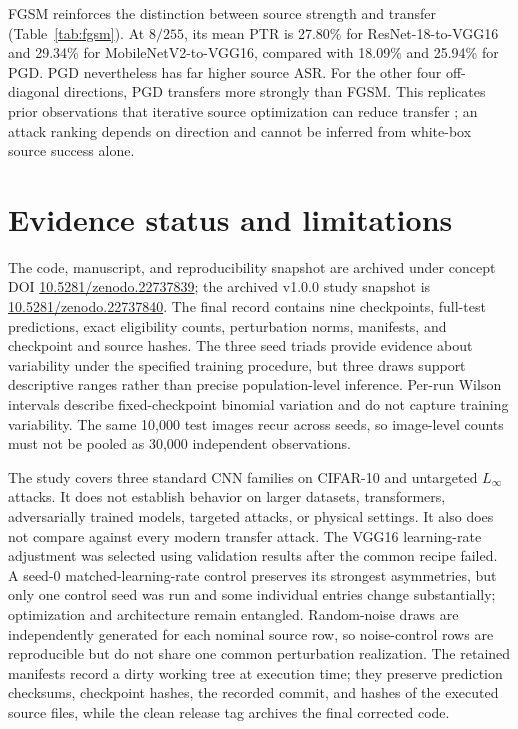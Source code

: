 \documentclass[10pt,twocolumn]{article}
\begin{document}
FGSM reinforces the distinction between source strength and transfer (Table~\ref{tab:fgsm}). At $8/255$, its mean PTR is 27.80\% for ResNet-18-to-VGG16 and 29.34\% for MobileNetV2-to-VGG16, compared with 18.09\% and 25.94\% for PGD. PGD nevertheless has far higher source ASR. For the other four off-diagonal directions, PGD transfers more strongly than FGSM. This replicates prior observations that iterative source optimization can reduce transfer \cite{dong}; an attack ranking depends on direction and cannot be inferred from white-box source success alone.

\section{Evidence status and limitations}
The code, manuscript, and reproducibility snapshot are archived under concept DOI \href{https://doi.org/10.5281/zenodo.22737839}{10.5281/zenodo.22737839}; the archived v1.0.0 study snapshot is \href{https://doi.org/10.5281/zenodo.22737840}{10.5281/zenodo.22737840}. The final record contains nine checkpoints, full-test predictions, exact eligibility counts, perturbation norms, manifests, and checkpoint and source hashes. The three seed triads provide evidence about variability under the specified training procedure, but three draws support descriptive ranges rather than precise population-level inference. Per-run Wilson intervals describe fixed-checkpoint binomial variation and do not capture training variability. The same 10,000 test images recur across seeds, so image-level counts must not be pooled as 30,000 independent observations.

The study covers three standard CNN families on CIFAR-10 and untargeted $L_\infty$ attacks. It does not establish behavior on larger datasets, transformers, adversarially trained models, targeted attacks, or physical settings. It also does not compare against every modern transfer attack. The VGG16 learning-rate adjustment was selected using validation results after the common recipe failed. A seed-0 matched-learning-rate control preserves its strongest asymmetries, but only one control seed was run and some individual entries change substantially; optimization and architecture remain entangled. Random-noise draws are independently generated for each nominal source row, so noise-control rows are reproducible but do not share one common perturbation realization. The retained manifests record a dirty working tree at execution time; they preserve prediction checksums, checkpoint hashes, the recorded commit, and hashes of the executed source files, while the clean release tag archives the final corrected code.
\end{document}
